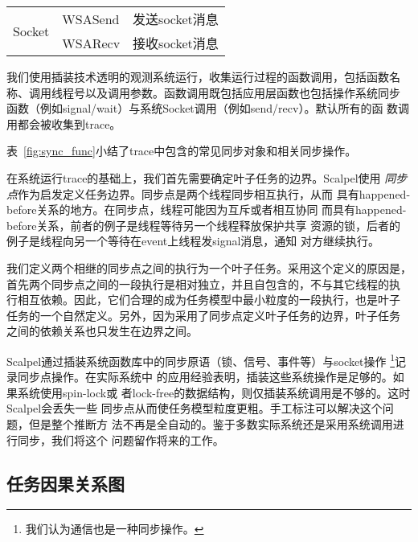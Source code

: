 \begin{table}
\begin{minipage}{0.8\linewidth}
\begin{tabular}{lll}
\multirow{2}{*}{Socket} & WSASend & 发送socket消息 \\
                        & WSARecv & 接收socket消息 \\

\bottomrule[1.5pt]
\end{tabular}
\end{minipage}
\end{table}

我们使用插装技术透明的观测系统运行，收集运行过程的函数调用，包括函数名
称、调用线程号以及调用参数。函数调用既包括应用层函数也包括操作系统同步
函数（例如signal/wait）与系统Socket调用（例如send/recv）。默认所有的函
数调用都会被收集到trace。

表~\ref{fig:sync_func}小结了trace中包含的常见同步对象和相关同步操作。

在系统运行trace的基础上，我们首先需要确定叶子任务的边界。Scalpel使用
\emph{同步点}作为启发定义任务边界。同步点是两个线程同步相互执行，从而
具有happened-before关系的地方。在同步点，线程可能因为互斥或者相互协同
而具有happened-before关系，前者的例子是线程等待另一个线程释放保护共享
资源的锁，后者的例子是线程向另一个等待在event上线程发signal消息，通知
对方继续执行。

我们定义两个相继的同步点之间的执行为一个叶子任务。采用这个定义的原因是，
首先两个同步点之间的一段执行是相对独立，并且自包含的，不与其它线程的执
行相互依赖。因此，它们合理的成为任务模型中最小粒度的一段执行，也是叶子
任务的一个自然定义。另外，因为采用了同步点定义叶子任务的边界，叶子任务
之间的依赖关系也只发生在边界之间。

%

Scalpel通过插装系统函数库中的同步原语（锁、信号、事件等）与socket操作
\footnote{我们认为通信也是一种同步操作。}记录同步点操作。在实际系统中
的应用经验表明，插装这些系统操作是足够的。如果系统使用spin-lock或
者lock-free的数据结构，则仅插装系统调用是不够的。这时Scalpel会丢失一些
同步点从而使任务模型粒度更粗。手工标注可以解决这个问题，但是整个推断方
法不再是全自动的。鉴于多数实际系统还是采用系统调用进行同步，我们将这个
问题留作将来的工作。

\subsection{任务因果关系图}

